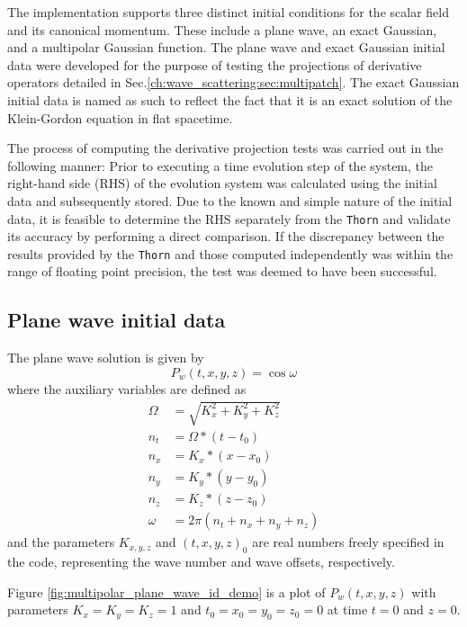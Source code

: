 The implementation supports three distinct initial conditions for the scalar field and its canonical momentum. These include a plane wave, an exact Gaussian, and a multipolar Gaussian function. The plane wave and exact Gaussian initial data were developed for the purpose of testing the projections of derivative operators detailed in Sec.\ref{ch:wave_scattering:sec:multipatch}. The exact Gaussian initial data is named as such to reflect the fact that it is an exact solution of the Klein-Gordon equation in flat spacetime.

The process of computing the derivative projection tests was carried out in the following manner: Prior to executing a time evolution step of the system, the right-hand side (RHS) of the evolution system was calculated using the initial data and subsequently stored. Due to the known and simple nature of the initial data, it is feasible to determine the RHS separately from the \texttt{Thorn} and validate its accuracy by performing a direct comparison. If the discrepancy between the results provided by the \texttt{Thorn} and those computed independently was within the range of floating point precision, the test was deemed to have been successful.

\subsection{Plane wave initial data}

The plane wave solution is given by
%
\begin{equation}
  P_w(t,x,y,z) = \cos\omega
\end{equation}
%
where the auxiliary variables are defined as
\begin{align}
  \Omega & = \sqrt{K_x^2 + K_y^2 + K_z^2}               \\
  n_t    & = \Omega * (t - t_0)                         \\
  n_x    & = K_x * (x - x_0)                            \\
  n_y    & = K_y * (y - y_0)                            \\
  n_z    & = K_z * (z - z_0)                            \\
  \omega & = 2 \pi \left( n_t + n_x + n_y + n_z \right)
\end{align}
%
and the parameters $K_{x,y,z}$ and $(t,x,y,z)_0$ are real numbers freely specified in the code, representing the wave number and wave offsets, respectively.

Figure \ref{fig:multipolar_plane_wave_id_demo} is a plot of $P_w(t,x,y,z)$ with parameters $K_x = K_y = K_z = 1$ and $t_0 = x_0 = y_0 = z_0 = 0$ at time $t=0$ and $z=0$.

